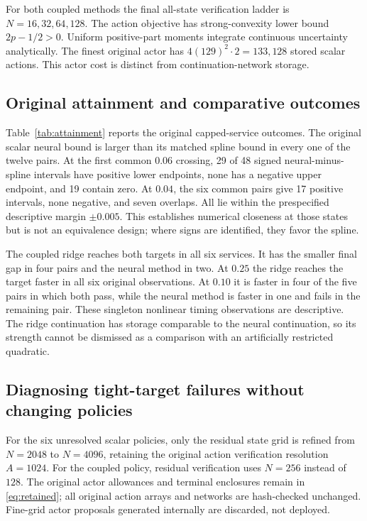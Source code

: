 \documentclass[ecta,nameyear,draft]{econsocart}
\begin{document}
For both coupled methods the final all-state verification ladder is $N=16,32,64,128$. The action objective has strong-convexity lower bound $2p-1/2>0$. Uniform positive-part moments integrate continuous uncertainty analytically. The finest original actor has $4(129)^2\cdot2=133{,}128$ stored scalar actions. This actor cost is distinct from continuation-network storage.

\subsection{Original attainment and comparative outcomes}

Table~\ref{tab:attainment} reports the original capped-service outcomes. The original scalar neural bound is larger than its matched spline bound in every one of the twelve pairs. At the first common $0.06$ crossing, 29 of 48 signed neural-minus-spline intervals have positive lower endpoints, none has a negative upper endpoint, and 19 contain zero. At $0.04$, the six common pairs give 17 positive intervals, none negative, and seven overlaps. All lie within the prespecified descriptive margin $\pm0.005$. This establishes numerical closeness at those states but is not an equivalence design; where signs are identified, they favor the spline.

The coupled ridge reaches both targets in all six services. It has the smaller final gap in four pairs and the neural method in two. At $0.25$ the ridge reaches the target faster in all six original observations. At $0.10$ it is faster in four of the five pairs in which both pass, while the neural method is faster in one and fails in the remaining pair. These singleton nonlinear timing observations are descriptive. The ridge continuation has storage comparable to the neural continuation, so its strength cannot be dismissed as a comparison with an artificially restricted quadratic.

\subsection{Diagnosing tight-target failures without changing policies}

For the six unresolved scalar policies, only the residual state grid is refined from $N=2048$ to $N=4096$, retaining the original action verification resolution $A=1024$. For the coupled policy, residual verification uses $N=256$ instead of $128$. The original actor allowances and terminal enclosures remain in \eqref{eq:retained}; all original action arrays and networks are hash-checked unchanged. Fine-grid actor proposals generated internally are discarded, not deployed.
\end{document}
